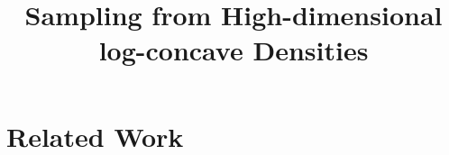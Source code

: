 \documentclass[11pt]{article}
\title{Sampling from High-dimensional log-concave Densities}
\begin{document}
\maketitle

\section{Related Work} 
\end{document}

